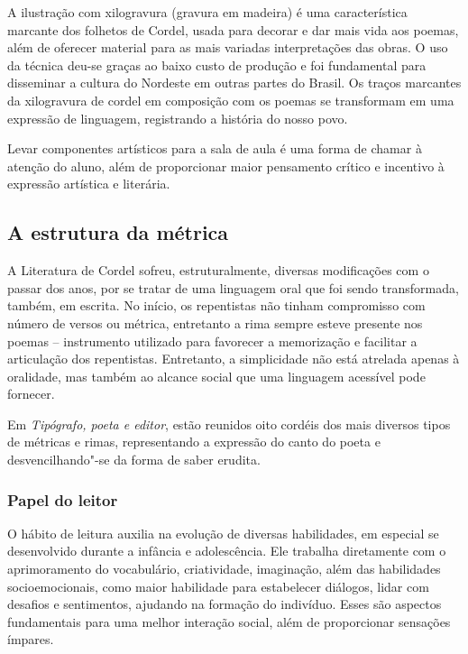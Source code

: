 \documentclass[12pt]{extarticle}
\begin{document}
A ilustração com xilogravura (gravura em madeira) é uma característica marcante
dos folhetos de Cordel, usada para decorar e dar mais vida aos poemas, além de
oferecer material para as mais variadas interpretações das obras. O uso da
técnica deu-se graças ao baixo custo de produção e foi fundamental para
disseminar a cultura do Nordeste em outras partes do Brasil. Os traços
marcantes da xilogravura de cordel em composição com os poemas se transformam
em uma expressão de linguagem, registrando a história do nosso povo.

Levar componentes artísticos para a sala de aula é uma forma de chamar
à atenção do aluno, além de proporcionar maior pensamento crítico e incentivo
à expressão artística e literária.


\subsection{A estrutura da métrica}

A Literatura de Cordel sofreu, estruturalmente, diversas modificações com
o passar dos anos, por se tratar de uma linguagem oral que foi sendo
transformada, também, em escrita. No início, os repentistas não tinham
compromisso com número de versos ou métrica, entretanto a rima sempre esteve
presente nos poemas -- instrumento utilizado para favorecer a memorização
e facilitar a articulação dos repentistas. Entretanto, a simplicidade não está
atrelada apenas à oralidade, mas também ao alcance social que uma linguagem
acessível pode fornecer.

Em \emph{Tipógrafo, poeta e editor}, estão reunidos oito cordéis dos mais diversos
tipos de métricas e rimas, representando a expressão do canto do poeta
e desvencilhando"-se da forma de saber erudita.

\subsubsection{Papel do leitor}

O hábito de leitura auxilia na evolução de diversas habilidades, em especial se
desenvolvido durante a infância e adolescência. Ele trabalha diretamente com
o aprimoramento do vocabulário, criatividade, imaginação, além das habilidades
socioemocionais, como maior habilidade para estabelecer diálogos, lidar com
desafios e sentimentos, ajudando na formação do indivíduo. Esses são aspectos
fundamentais para uma melhor interação social, além de proporcionar sensações
ímpares.
\end{document}
